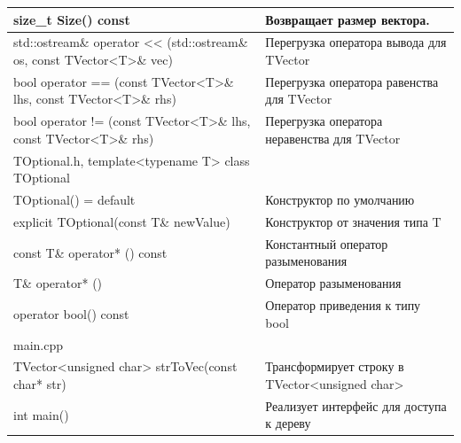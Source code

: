 \begin{longtable}{|p{7.5cm}|p{7.5cm}|}
\hline
size\_t Size() const & Возвращает размер вектора.\\
\hline
\hline
std::ostream\& operator << (std::ostream\& os, const TVector<T>\& vec)&Перегрузка оператора вывода для TVector\\
\hline
bool operator == (const TVector<T>\& lhs, const TVector<T>\& rhs)&Перегрузка оператора равенства для TVector\\
\hline
bool operator != (const TVector<T>\& lhs, const TVector<T>\& rhs)&Перегрузка оператора неравенства для TVector\\
\hline
\hline
\rowcolor{lightgray}
\multicolumn{2}{|c|} {TOptional.h, template<typename T> class TOptional}\\
\hline TOptional() = default & Конструктор по умолчанию\\
\hline explicit TOptional(const T\& newValue) & Конструктор от значения типа T\\
\hline const T\& operator* () const & Константный оператор разыменования\\
\hline T\& operator* () & Оператор разыменования\\
\hline operator bool() const & Оператор приведения к типу bool\\
\hline
\hline
\rowcolor{lightgray}
\multicolumn{2}{|c|} {main.cpp}\\
\hline TVector<unsigned char> strToVec(const char* str)&Трансформирует строку в TVector<unsigned char> \\
\hline int main() & Реализует интерфейс для доступа к дереву\\
\hline

\end{longtable}

\pagebreak

